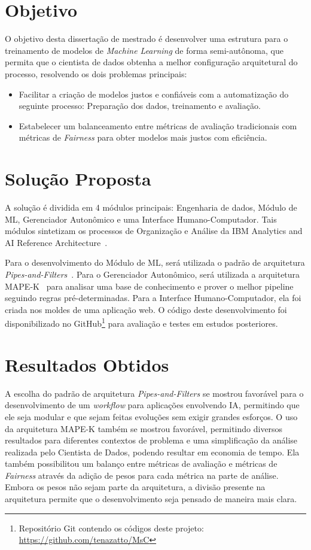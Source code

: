 \documentclass[portugues]{ic-tese}
\begin{document}
\section{Objetivo}

O objetivo desta dissertação de mestrado é desenvolver uma estrutura para o treinamento de modelos de \textit{Machine Learning} de forma semi-autônoma, que permita que o cientista de dados obtenha a melhor configuração arquitetural do processo, resolvendo os dois problemas principais:

\begin{itemize}
\item Facilitar a criação de modelos justos e confiáveis com a automatização do seguinte processo: Preparação dos dados, treinamento e avaliação.
\item Estabelecer um balanceamento entre métricas de avaliação tradicionais com métricas de \textit{Fairness} para obter modelos mais justos com eficiência.
\end{itemize}

\section{Solução Proposta}

A solução é dividida em 4 módulos principais: Engenharia de dados, Módulo de ML, Gerenciador Autonômico e uma Interface Humano-Computador. Tais módulos sintetizam os processos de Organização e Análise da IBM Analytics and AI Reference Architecture~\citep{IBM_2021}.

Para o desenvolvimento do Módulo de ML, será utilizada o padrão de arquitetura \textit{Pipes-and-Filters}~\citep{Garlan_1993}. Para o Gerenciador Autonômico, será utilizada a arquitetura MAPE-K~\citep{IBM_2005} para analisar uma base de conhecimento e prover o melhor pipeline seguindo regras pré-determinadas. Para a Interface Humano-Computador, ela foi criada nos moldes de uma aplicação web. O código deste desenvolvimento foi disponibilizado no GitHub\footnote{Repositório Git contendo os códigos deste projeto: \url{https://github.com/tenazatto/MsC}} para avaliação e testes em estudos posteriores.

\section{Resultados Obtidos}

A escolha do padrão de arquitetura \textit{Pipes-and-Filters} se mostrou favorável para o desenvolvimento de um \textit{workflow} para aplicações envolvendo IA, permitindo que ele seja modular e que sejam feitas evoluções sem exigir grandes esforços. O uso da arquitetura MAPE-K também se mostrou favorável, permitindo diversos resultados para diferentes contextos de problema e uma simplificação da análise realizada pelo Cientista de Dados, podendo resultar em economia de tempo. Ela também possibilitou um balanço entre métricas de avaliação e métricas de \textit{Fairness} através da adição de pesos para cada métrica na parte de análise. Embora os pesos não sejam parte da arquitetura, a divisão presente na arquitetura permite que o desenvolvimento seja pensado de maneira mais clara.
\end{document}
